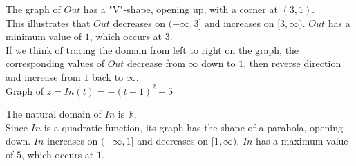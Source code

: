 \documentclass{ximera}
\begin{document}
The graph of $Out$ has a "V"-shape, opening up, with a corner at $(3,1)$. \\
This illustrates that $Out$ decreases on $(-\infty, 3]$ and increases on $[3, \infty)$.  $Out$ has a minimum value of $1$, which occurs at $3$. \\

If we think of tracing the domain from left to right on the graph, the corresponding values of $Out$ decrease from $\infty$ down to $1$, then reverse direction and increase from $1$ back to $\infty$. \\



Graph of $z = In(t) = -(t-1)^2 + 5$





\begin{image}
\end{image}
The natural domain of $In$ is $\mathbb{R}$. \\


Since $In$ is a quadratic function, its graph has the shape of a parabola, opening down.  $In$ increases on $(-\infty, 1]$ and decreases on $[1, \infty)$. $In$ has a maximum value of $5$, which occurs at $1$. \\
\end{document}
